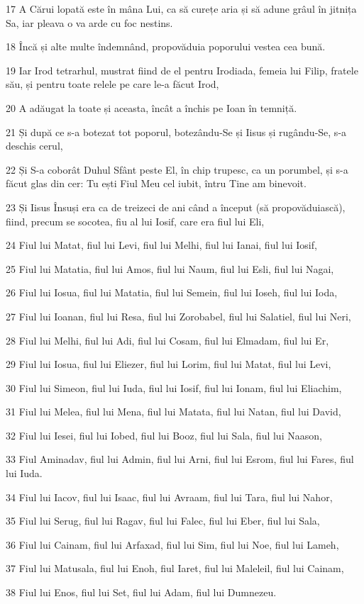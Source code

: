 \par 17 A Cărui lopată este în mâna Lui, ca să curețe aria și să adune grâul în jitnița Sa, iar pleava o va arde cu foc nestins.
\par 18 Încă și alte multe îndemnând, propovăduia poporului vestea cea bună.
\par 19 Iar Irod tetrarhul, mustrat fiind de el pentru Irodiada, femeia lui Filip, fratele său, și pentru toate relele pe care le-a făcut Irod,
\par 20 A adăugat la toate și aceasta, încât a închis pe Ioan în temniță.
\par 21 Și după ce s-a botezat tot poporul, botezându-Se și Iisus și rugându-Se, s-a deschis cerul,
\par 22 Și S-a coborât Duhul Sfânt peste El, în chip trupesc, ca un porumbel, și s-a făcut glas din cer: Tu ești Fiul Meu cel iubit, întru Tine am binevoit.
\par 23 Și Iisus Însuși era ca de treizeci de ani când a început (să propovăduiască), fiind, precum se socotea, fiu al lui Iosif, care era fiul lui Eli,
\par 24 Fiul lui Matat, fiul lui Levi, fiul lui Melhi, fiul lui Ianai, fiul lui Iosif,
\par 25 Fiul lui Matatia, fiul lui Amos, fiul lui Naum, fiul lui Esli, fiul lui Nagai,
\par 26 Fiul lui Iosua, fiul lui Matatia, fiul lui Semein, fiul lui Ioseh, fiul lui Ioda,
\par 27 Fiul lui Ioanan, fiul lui Resa, fiul lui Zorobabel, fiul lui Salatiel, fiul lui Neri,
\par 28 Fiul lui Melhi, fiul lui Adi, fiul lui Cosam, fiul lui Elmadam, fiul lui Er,
\par 29 Fiul lui Iosua, fiul lui Eliezer, fiul lui Lorim, fiul lui Matat, fiul lui Levi,
\par 30 Fiul lui Simeon, fiul lui Iuda, fiul lui Iosif, fiul lui Ionam, fiul lui Eliachim,
\par 31 Fiul lui Melea, fiul lui Mena, fiul lui Matata, fiul lui Natan, fiul lui David,
\par 32 Fiul lui Iesei, fiul lui Iobed, fiul lui Booz, fiul lui Sala, fiul lui Naason,
\par 33 Fiul Aminadav, fiul lui Admin, fiul lui Arni, fiul lui Esrom, fiul lui Fares, fiul lui Iuda.
\par 34 Fiul lui Iacov, fiul lui Isaac, fiul lui Avraam, fiul lui Tara, fiul lui Nahor,
\par 35 Fiul lui Serug, fiul lui Ragav, fiul lui Falec, fiul lui Eber, fiul lui Sala,
\par 36 Fiul lui Cainam, fiul lui Arfaxad, fiul lui Sim, fiul lui Noe, fiul lui Lameh,
\par 37 Fiul lui Matusala, fiul lui Enoh, fiul Iaret, fiul lui Maleleil, fiul lui Cainam,
\par 38 Fiul lui Enos, fiul lui Set, fiul lui Adam, fiul lui Dumnezeu.

